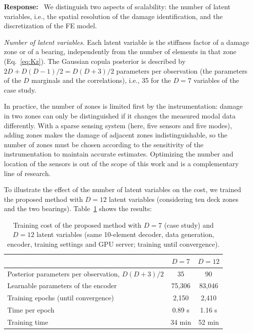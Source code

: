 \documentclass[11pt]{article}
\newenvironment{response}{\par\smallskip\noindent\color{resp}\textbf{Response:}\ }{\par}
\begin{document}
\begin{response}
We distinguish two aspects of scalability: the number of latent variables, i.e., the spatial resolution of the damage identification, and the discretization of the FE model.

\textit{Number of latent variables.} 
Each latent variable is the stiffness factor of a damage zone or of a bearing, independently from the number of elements in that zone (Eq.~\eqref{eq:Kz}). 
The Gaussian copula posterior is described by $2D+D(D-1)/2=D(D+3)/2$ parameters per observation (the parameters of the $D$ marginals and the correlations), i.e., 35 for the $D=7$ variables of the case study. 

In practice, the number of zones is limited first by
the instrumentation: damage in two zones can only be distinguished if it changes the measured modal data differently.
With a sparse sensing system (here, five sensors and five modes), adding zones makes the damage of adjacent zones indistinguishable, so the number of zones must be chosen according to the sensitivity of the instrumentation to maintain accurate estimates. Optimizing the number and location of the sensors is out of the scope of this work and is
a complementary line of research.

To illustrate the effect of the number of latent variables on the cost, we trained the
proposed method with $D=12$ latent variables (considering ten deck zones and the two bearings). 
Table~\ref{tab:scal} shows the results:  
\begin{table}[H]
\centering\small
\caption{Training cost of the proposed method with $D=7$ (case study) and $D=12$ latent variables (same 10-element
decoder, data generation, encoder, training settings and GPU server; training until convergence).}
\label{tab:scal}
\begin{tabular}{lcc}
\toprule
 & $D=7$ & $D=12$ \\
\midrule
Posterior parameters per observation, $D(D+3)/2$ & 35 & 90 \\
Learnable parameters of the encoder & 75,306 & 83,046 \\
Training epochs (until convergence) & 2,150 & 2,410 \\
Time per epoch & 0.89 s & 1.16 s \\
Training time & 34 min & 52 min \\
\bottomrule
\end{tabular}
\end{table}


\end{response}
\end{document}
